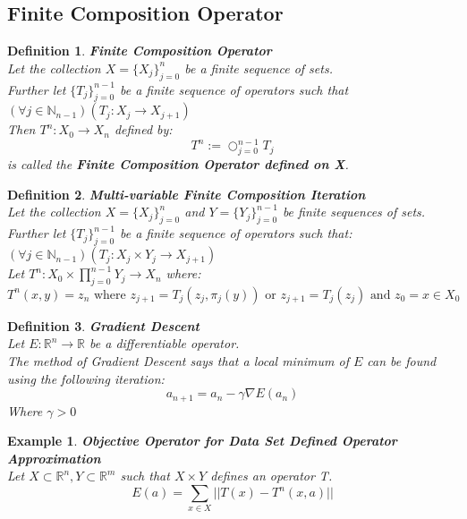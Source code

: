 \documentclass[12pt]{extarticle}
\theoremstyle{plain}
\theoremstyle{Definition}
\newtheorem{def.}{Definition}[section]
\theoremstyle{Definition}
\theoremstyle{plain}
\newtheorem{exmp}{Example}[section]
\begin{document}
\subsection{Finite Composition Operator}
\begin{def.} \textbf{Finite Composition Operator} \\ 
	Let the collection $X = \{X_j\}_{j=0}^{n}$ be a finite sequence of sets. \\ 
	Further let $\{T_j\}_{j=0}^{n-1}$ be a finite sequence of operators such that $(\forall j \in \mathbb{N}_{n-1})(T_j : X_j \to X_{j+1})$ \\ 
	Then $T^n : X_0 \to X_{n}$ defined by: 
	$$T^n := \bigcirc_{j=0}^{n-1} T_j$$ 
	is called the \textbf{Finite Composition Operator defined on X}. \\ 
\end{def.}
\begin{def.} \textbf{Multi-variable Finite Composition Iteration} \\ 
	Let the collection $X = \{X_j\}_{j=0}^n$ and $Y = \{Y_j\}_{j=0}^{n-1}$ be finite sequences of sets. \\ 
	Further let $\{T_j\}_{j=0}^{n-1}$ be a finite sequence of operators such that: $(\forall j \in \mathbb{N}_{n-1})(T_j : X_j \times Y_j \to X_{j+1})$ \\
	Let $T^n : X_0 \times \prod_{j=0}^{n-1}Y_j \to X_n$ where: \\ 
	$$T^n (x,y) = z_n \text{ where } z_{j+1} = T_j( z_{j},\pi_j (y) ) \text{ or } z_{j+1} = T_j( z_{j} )  \text{ and } z_0 = x \in X_0$$
\end{def.}
\begin{def.} \textbf{Gradient Descent} \\ 
Let $E : \mathbb{R}^n \to \mathbb{R}$ be a differentiable operator. \\ 
The method of Gradient Descent says that a local minimum of $E$ can be found using the following iteration: \\ 
$$a_{n+1} = a_n - \gamma \nabla E(a_n)$$
Where $\gamma > 0$ \\ 
\end{def.}
\begin{exmp} \textbf{Objective Operator for Data Set Defined Operator Approximation} \\ 		
Let $X \subset \mathbb{R}^n, Y \subset \mathbb{R}^m$ such that $X\times Y$ defines an operator T. \\ 
$$E(a) = \sum_{x \in X} ||T(x) - T^n(x,a)||$$ 
\end{exmp}
\newpage
\end{document}
